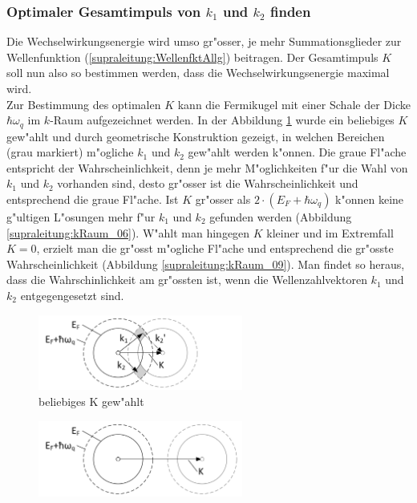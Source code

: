 \begin{refsection}
\subsubsection{Optimaler Gesamtimpuls von $k_1$ und $k_2$ finden}
Die Wechselwirkungsenergie wird umso gr"osser, je mehr Summationsglieder zur Wellenfunktion (\ref{supraleitung:WellenfktAllg}) beitragen. Der Gesamtimpuls $K$ soll nun also so bestimmen werden, dass die Wechselwirkungsenergie maximal wird.
\\
Zur Bestimmung des optimalen $K$ kann die Fermikugel mit einer Schale der Dicke $\hbar\omega_q$ im $k$-Raum aufgezeichnet werden. In der Abbildung \ref{supraleitung:kRaum_05} wurde ein beliebiges $K$ gew"ahlt und durch geometrische Konstruktion gezeigt, in welchen Bereichen (grau markiert) m"ogliche $k_1$ und $k_2$ gew"ahlt werden k"onnen. Die graue Fl"ache entspricht der Wahrscheinlichkeit, denn je mehr M"oglichkeiten f"ur die Wahl von $k_1$ und $k_2$ vorhanden sind, desto gr"osser ist die Wahrscheinlichkeit und entsprechend die graue Fl"ache. Ist $K$ gr"osser als $2\cdot(E_F+\hbar\omega_q)$ k"onnen keine g"ultigen L"osungen mehr f"ur $k_1$ und $k_2$ gefunden werden (Abbildung \ref{supraleitung:kRaum_06}). W"ahlt man hingegen $K$ kleiner und im Extremfall $K=0$, erzielt man die gr"osst m"ogliche Fl"ache und entsprechend die gr"osste Wahrscheinlichkeit (Abbildung \ref{supraleitung:kRaum_09}). Man findet so heraus, dass die Wahrschinlichkeit am gr"ossten ist, wenn die Wellenzahlvektoren $k_1$ und $k_2$ entgegengesetzt sind.
\begin{figure}	
\centering
\includegraphics[width=0.6\textwidth]{supraleitung/kGraphic_05.png} %
\caption{beliebiges K gew"ahlt
\label{supraleitung:kRaum_05}}
\end{figure}
\begin{figure}	
\centering
\includegraphics[width=0.6\textwidth]{supraleitung/kGraphic_06.png} %

\end{figure}
\end{refsection}
